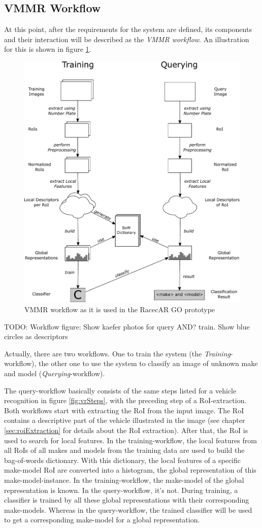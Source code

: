 \subsection{VMMR Workflow}
At this point, after the requirements for the system are defined, its components and their interaction will be described as the \emph{VMMR workflow}. An illustration for this is shown in figure \ref{fig:vmmrWorkflow}.

\begin{figure}[btph]
  \centering
        \includegraphics[width=.75\linewidth]{gfx/vmmr_workflow}
        \caption{VMMR workflow as it is used in the RacecAR GO prototype}
        \label{fig:vmmrWorkflow}
\end{figure}
TODO: Workflow figure: Show kaefer photos for query AND? train. Show blue circles as descriptors

Actually, there are two workflows. One to train the system (the \emph{Training}-workflow), the other one to use the system to classify an image of unknown make and model (\emph{Querying}-workflow).

The query-workflow basically consists of the same steps listed for a vehicle recognition in figure \ref{fig:vrSteps}, with the preceding step of a RoI-extraction. Both workflows start with extracting the RoI from the input image. The RoI contains a descriptive part of the vehicle illustrated in the image (see chapter \ref{sec:roiExtraction} for details about the RoI extraction). After that, the RoI is used to search for local features. In the training-workflow, the local features from all RoIs of all makes and models from the training data are used to build the bag-of-words dictionary. With this dictionary, the local features of a specific make-model RoI are converted into a histogram, the global representation of this make-model-instance. In the training-workflow, the make-model of the global representation is known. In the query-workflow, it's not.
During training, a classifier is trained by all these global representations with their corresponding make-models. Whereas in the query-workflow, the trained classifier will be used to get a corresponding make-model for a global representation.


